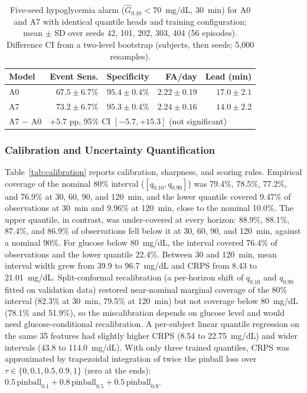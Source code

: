 \documentclass[journal]{IEEEtran}
\begin{document}
\begin{table}[t]
\centering
\caption{Five-seed hypoglycemia alarm ($\hat{G}_{0.10} < 70$~mg/dL, 30~min) for A0 and A7 with identical quantile heads and training configuration; mean $\pm$ SD over seeds 42, 101, 202, 303, 404 (56 episodes). Difference CI from a two-level bootstrap (subjects, then seeds; 5,000 resamples).}
\label{tab:hypo_multiseed}
\footnotesize
\setlength{\tabcolsep}{4pt}
\begin{tabular}{lrrrr}
\toprule
Model & Event Sens. & Specificity & FA/day & Lead (min) \\
\midrule
A0 & $67.5 \pm 6.7\%$ & $95.4 \pm 0.4\%$ & $2.22 \pm 0.19$ & $17.0 \pm 2.1$ \\
A7 & $73.2 \pm 6.7\%$ & $95.3 \pm 0.4\%$ & $2.24 \pm 0.16$ & $14.0 \pm 2.2$ \\
\midrule
A7 $-$ A0 & \multicolumn{4}{l}{$+5.7$ pp, 95\% CI $[-5.7, +15.3]$ (not significant)} \\
\bottomrule
\end{tabular}
\end{table}

\subsubsection{Calibration and Uncertainty Quantification}
Table~\ref{tab:calibration} reports calibration, sharpness, and scoring rules. Empirical coverage of the nominal 80\% interval ($[q_{0.10}, q_{0.90}]$) was 79.4\%, 78.5\%, 77.2\%, and 76.9\% at 30, 60, 90, and 120~min, and the lower quantile covered 9.47\% of observations at 30~min and 9.96\% at 120~min, close to the nominal 10.0\%. The upper quantile, in contrast, was under-covered at every horizon: 88.9\%, 88.1\%, 87.4\%, and 86.9\% of observations fell below it at 30, 60, 90, and 120~min, against a nominal 90\%. For glucose below 80~mg/dL, the interval covered 76.4\% of observations and the lower quantile 22.4\%. Between 30 and 120~min, mean interval width grew from 39.9 to 96.7~mg/dL and CRPS from 8.43 to 21.01~mg/dL. Split-conformal recalibration (a per-horizon shift of $q_{0.10}$ and $q_{0.90}$ fitted on validation data) restored near-nominal marginal coverage of the 80\% interval (82.3\% at 30~min, 79.5\% at 120~min) but not coverage below 80~mg/dL (78.1\% and 51.9\%), so the miscalibration depends on glucose level and would need glucose-conditional recalibration. A per-subject linear quantile regression on the same 35 features had slightly higher CRPS (8.54 to 22.75~mg/dL) and wider intervals (43.8 to 114.0~mg/dL). With only three trained quantiles, CRPS was approximated by trapezoidal integration of twice the pinball loss over $\tau \in \{0, 0.1, 0.5, 0.9, 1\}$ (zero at the ends): $0.5\,\text{pinball}_{0.1} + 0.8\,\text{pinball}_{0.5} + 0.5\,\text{pinball}_{0.9}$.
\end{document}
